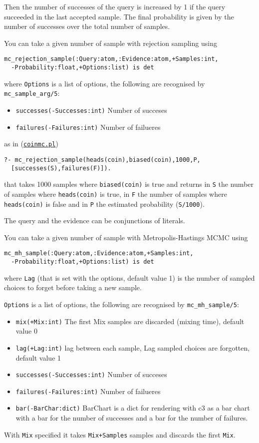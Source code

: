 Then the number of successes of the query is increased by 1 if the query succeeded in the last accepted
sample. The final probability is given by the number of successes over the total
number of samples.

You can take a given number of sample with rejection sampling using
\begin{verbatim}
mc_rejection_sample(:Query:atom,:Evidence:atom,+Samples:int,
  -Probability:float,+Options:list) is det
\end{verbatim}
where
\verb|Options| is a list of options, the following are recognised by \verb|mc_sample_arg/5|:
\begin{itemize}
\item \verb|successes(-Successes:int)|
Number of succeses
\item \verb|failures(-Failures:int)|
Number of failueres
\end{itemize}
as in (\href{http://cplint.eu/example/inference/coinmc.pl}{\texttt{coinmc.pl}})
\begin{verbatim}
?- mc_rejection_sample(heads(coin),biased(coin),1000,P,
  [successes(S),failures(F)]).
\end{verbatim}
that takes 1000 samples where \verb|biased(coin)| is true and returns in \verb|S| the number of samples where
\verb|heads(coin)| is true, in \verb|F| the number of samples where \verb|heads(coin)| is false and in \verb|P| the
estimated probability (\verb|S/1000|).

The query and the evidence can be conjunctions of literals.

You can take a given number of sample with Metropolis-Hastings MCMC using
\begin{verbatim}
mc_mh_sample(:Query:atom,:Evidence:atom,+Samples:int,
  -Probability:float,+Options:list) is det
\end{verbatim}
where \verb|Lag| (that is set with the options, default value 1) is the number of sampled choices to forget before taking a new sample.

\verb|Options| is a list of options, the following are recognised by \verb|mc_mh_sample/5|:
\begin{itemize}
\item \verb|mix(+Mix:int)|
The first Mix samples are discarded (mixing time), default value 0
\item \verb|lag(+Lag:int)|
lag between each sample, Lag sampled choices are forgotten, default value 1
\item \verb|successes(-Successes:int)|
Number of succeses
\item \verb|failures(-Failures:int)|
Number of failueres
\item \verb|bar(-BarChar:dict)|
BarChart is a dict for rendering with c3 as a bar chart with
a bar for the number of successes and a bar for the number
of failures.
\end{itemize}
With \verb|Mix| specified it takes \verb|Mix+Samples| samples and discards the first \verb|Mix|.

